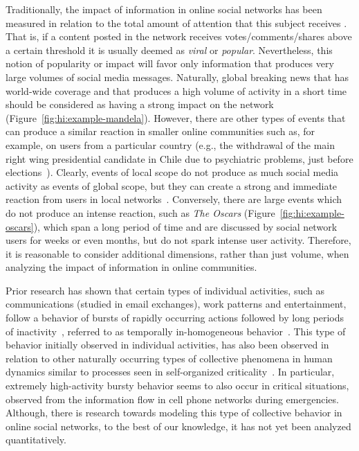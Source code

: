 Traditionally, the impact of information in online social networks has been
measured in relation to the total amount of attention that this subject receives
\cite{berger2012makes,iribarren2011branching,guerini2011exploring,mills2012virality,gaugaz2012predicting}.
%
That is, if a content posted in the network receives votes/comments/shares above
a certain threshold it is usually deemed as {\em viral} or {\em popular}.
%
Nevertheless, this notion of popularity or impact will favor only information
that produces very large volumes of social media messages. 
%
Naturally, global breaking news that has world-wide coverage and that produces a
high volume of activity in a short time should be considered as having a strong
impact on the network (Figure~\ref{fig:hi:example-mandela}).  
%
However, there are other types of events that can produce a similar reaction in
smaller online communities such as, for example, on users from a particular
country (e.g., the withdrawal of the main right wing presidential candidate in
Chile due to psychiatric problems, just before
elections~\cite{chile_elections}). 
%
Clearly, events of local scope do not produce as much social media activity as
events of global scope, but they can create a strong and immediate reaction from
users in local networks~\cite{ReisBOPKA15}. 
%
Conversely, there are large events which do not produce an intense reaction,
such as {\em The Oscars} (Figure~\ref{fig:hi:example-oscars}), which span a long
period of time and are discussed by social network users for weeks or even
months, but do not spark intense user activity. 
%
Therefore, it is reasonable to consider additional dimensions, rather than just volume,
when analyzing the impact of information in online communities.  

Prior research has shown that certain types of individual activities, such as
communications (studied in email exchanges), work patterns and entertainment,
follow a behavior of bursts of rapidly occurring actions followed by long
periods of inactivity~\cite{barabasi2005origin}, referred to as {temporally
in-homogeneous} behavior~\cite{karsai2012universal}.  
%
This type of behavior initially observed in individual activities, has also been
observed in relation to other naturally occurring types of collective phenomena
in human dynamics similar to processes seen in self-organized
criticality~\cite{karsai2012universal}.  
%
In particular, extremely high-activity bursty behavior seems to also occur in
critical situations, observed from the information flow in cell phone networks
during emergencies\cite{gao2014quantifying}.  
%
Although, there is research towards modeling this type of collective behavior
\cite{yan2013information} in online social networks, to the best of our
knowledge, it has not yet been analyzed quantitatively.



